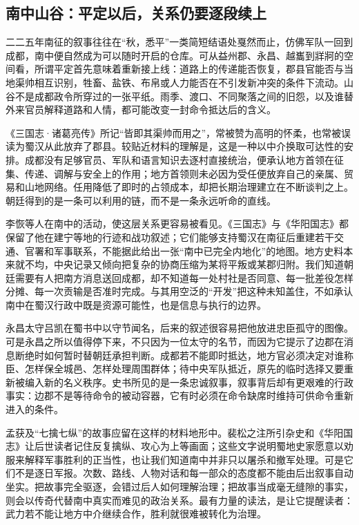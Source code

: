 \subsection{南中山谷：平定以后，关系仍要逐段续上}

二二五年南征的叙事往往在“秋，悉平”一类简短结语处戛然而止，仿佛军队一回到成都，南中便自然成为可以随时开启的仓库。可从益州郡、永昌、越巂到牂牁的空间看，所谓平定首先意味着重新接上线：道路上的传递能否恢复，郡县官能否与当地渠帅相互识别，牲畜、盐铁、布帛或人力能否在不引发新冲突的条件下流动。山谷不是成都政令所穿过的一张平纸。雨季、渡口、不同聚落之间的旧怨，以及谁替外来官员解释道路和人情，都可能改变一封命令抵达后的含义。

《三国志·诸葛亮传》所记“皆即其渠帅而用之”，常被赞为高明的怀柔，也常被误读为蜀汉从此放弃了郡县。较贴近材料的理解是，这是一种以中介换取可达性的安排。成都没有足够官员、军队和语言知识去逐村直接统治，便承认地方首领在征集、传递、调解与安全上的作用；地方首领则未必因为受任便放弃自己的亲属、贸易和山地网络。任用降低了即时的占领成本，却把长期治理建立在不断谈判之上。朝廷得到的是一条可以利用的链，而不是一条永远听命的直线。

李恢等人在南中的活动，使这层关系更容易被看见。《三国志》与《华阳国志》都保留了他在建宁等地的行迹和战功叙述；它们能够支持蜀汉在南征后重建若干交通、官署和军事联系，不能据此给出一张“南中已完全内地化”的地图。地方史料本来就不均，中央记录又倾向把复杂的协商压缩为某将平叛或某郡归附。我们知道朝廷需要有人把南方消息送回成都，却不知道每一处村社是否同意、每一批差役怎样分摊、每一次贡输是否准时完成。与其用空泛的“开发”把这种未知盖住，不如承认南中在蜀汉行政中既是资源可能性，也是信息与执行的边界。

永昌太守吕凯在蜀书中以守节闻名，后来的叙述很容易把他放进忠臣孤守的图像。可是永昌之所以值得停下来，不只因为一位太守的名节，而因为它提示了边郡在消息断绝时如何暂时替朝廷承担判断。成都若不能即时抵达，地方官必须决定对谁称臣、怎样保全城邑、怎样处理周围群体；待中央军队抵近，原先的临时选择又要重新被编入新的名义秩序。史书所见的是一条忠诚叙事，叙事背后却有更艰难的行政事实：边郡不是等待命令的被动容器，它有时必须在命令缺席时维持可供命令重新进入的条件。

孟获及“七擒七纵”的故事应留在这样的材料地形中。裴松之注所引杂史和《华阳国志》让后世读者记住反复擒纵、攻心为上等画面；这些文字说明蜀地史家愿意以劝服来解释军事胜利的正当性，也让我们知道南中并非只以屠杀和撤军处理。可是它们不是逐日军报。次数、路线、人物对话和每一部众的态度都不能由后出叙事自动坐实。把故事完全驱逐，会错过后人如何理解治理；把故事当成毫无缝隙的事实，则会以传奇代替南中真实而难见的政治关系。最有力量的读法，是让它提醒读者：武力若不能让地方中介继续合作，胜利就很难被转化为治理。

